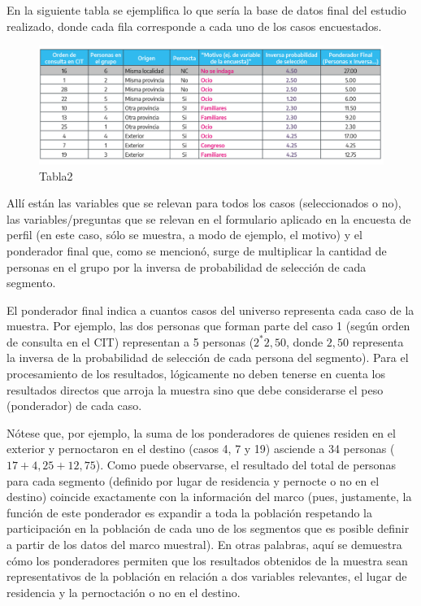 \documentclass[
]{book}
\begin{document}
En la siguiente tabla se ejemplifica lo que sería la base de datos final del estudio realizado, donde cada fila corresponde a cada uno de los casos encuestados.

\begin{figure}

{\centering \includegraphics[width=1\linewidth]{imagenes/tabla_2} 

}

\caption{Tabla2}\label{fig:Casosencuestados}
\end{figure}

Allí están las variables que se relevan para todos los casos (seleccionados o no), las variables/preguntas que se relevan en el formulario aplicado en la encuesta de perfil (en este caso, sólo se muestra, a modo de ejemplo, el motivo) y el ponderador final que, como se mencionó, surge de multiplicar la cantidad de personas en el grupo por la inversa de probabilidad de selección de cada segmento.

El ponderador final indica a cuantos casos del universo representa cada caso de la muestra. Por ejemplo, las dos personas que forman parte del caso 1 (según orden de consulta en el CIT) representan a 5 personas (\(2^* 2,50\), donde \(2,50\) representa la inversa de la probabilidad de selección de cada persona del segmento). Para el procesamiento de los resultados, lógicamente no deben tenerse en cuenta los resultados directos que arroja la muestra sino que debe considerarse el peso (ponderador) de cada caso.

Nótese que, por ejemplo, la suma de los ponderadores de quienes residen en el exterior y pernoctaron en el destino (casos 4, 7 y 19) asciende a 34 personas (\(17+4,25+12,75\)). Como puede observarse, el resultado del total de personas para cada segmento (definido por lugar de residencia y pernocte o no en el destino) coincide exactamente con la información del marco (pues, justamente, la función de este ponderador es expandir a toda la población respetando la participación en la población de cada uno de los segmentos que es posible definir a partir de los datos del marco muestral). En otras palabras, aquí se demuestra cómo los ponderadores permiten que los resultados obtenidos de la muestra sean representativos de la población en relación a dos variables relevantes, el lugar de residencia y la pernoctación o no en el destino.
\end{document}

